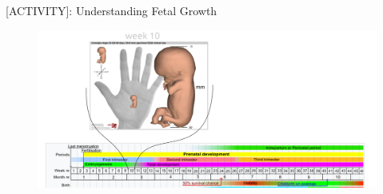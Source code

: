 {
\begin{frame}{[\faUsers ACTIVITY]: Understanding Fetal Growth}
      \begin{figure}
        \centering
        \includegraphics[width=1.0\textwidth]{./../figures/fetal-size/versions/drawing-v02.png}
      \end{figure}
\end{frame}
}
